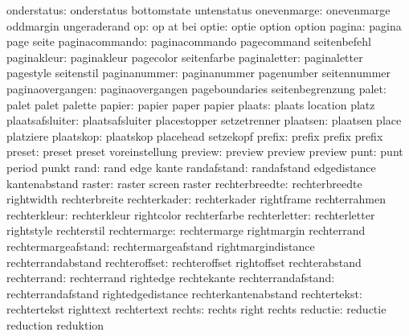          onderstatus:  onderstatus          bottomstate          untenstatus
         onevenmarge:  onevenmarge          oddmargin            ungeraderand
                  op:  op                   at                   bei
               optie:  optie                option               option
              pagina:  pagina               page                 seite
      paginacommando:  paginacommando       pagecommand          seitenbefehl
         paginakleur:  paginakleur          pagecolor            seitenfarbe
        paginaletter:  paginaletter         pagestyle            seitenstil
        paginanummer:  paginanummer         pagenumber           seitennummer
    paginaovergangen:  paginaovergangen     pageboundaries       seitenbegrenzung
               palet:  palet                palet                palette
              papier:  papier               paper                papier
              plaats:  plaats               location             platz
     plaatsafsluiter:  plaatsafsluiter      placestopper         setzetrenner
            plaatsen:  plaatsen             place                platziere
           plaatskop:  plaatskop            placehead            setzekopf
              prefix:  prefix               prefix               prefix
              preset:  preset               preset               voreinstellung
             preview:  preview              preview              preview
                punt:  punt                 period               punkt
                rand:  rand                 edge                 kante
         randafstand:  randafstand          edgedistance         kantenabstand
              raster:  raster               screen               raster
      rechterbreedte:  rechterbreedte       rightwidth           rechterbreite
        rechterkader:  rechterkader         rightframe           rechterrahmen
        rechterkleur:  rechterkleur         rightcolor           rechterfarbe
       rechterletter:  rechterletter        rightstyle           rechterstil
        rechtermarge:  rechtermarge         rightmargin          rechterrand
 rechtermargeafstand:  rechtermargeafstand  rightmargindistance  rechterrandabstand
       rechteroffset:  rechteroffset        rightoffset          rechterabstand
         rechterrand:  rechterrand          rightedge            rechtekante
  rechterrandafstand:  rechterrandafstand   rightedgedistance    rechterkantenabstand
        rechtertekst:  rechtertekst         righttext            rechtertext
              rechts:  rechts               right                rechts
            reductie:  reductie             reduction            reduktion

